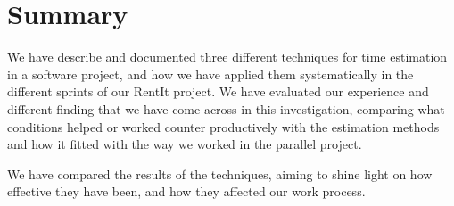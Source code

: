 \section{Summary}
We have describe and documented three different techniques for time estimation in a software project, and how we have applied them systematically in the different sprints of our RentIt project. We have evaluated our experience and different finding that we have come across in this investigation, comparing what conditions helped or worked counter productively with the estimation methods and how it fitted with the way we worked in the parallel project. 

We have compared the results of the techniques, aiming to shine light on how effective they have been, and how they affected our work process.
















